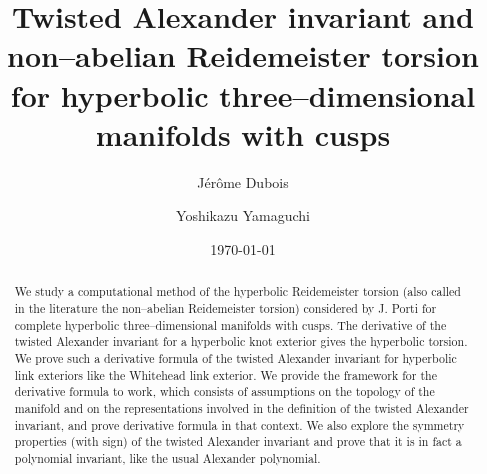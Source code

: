 \documentclass[a4paper]{amsart}
\theoremstyle{plain}
\theoremstyle{definition}
\theoremstyle{remark}
\begin{document}
%
%


\title{
Twisted Alexander invariant and non--abelian Reidemeister torsion for hyperbolic three--dimensional manifolds with cusps
}


\author{J\'er\^ome Dubois \and Yoshikazu Yamaguchi}

\address{Institut de Math\'ematiques de Jussieu, 
Universit\'e Paris Diderot--Paris 7, 
UFR de Math\'ematiques, 
Case 7012, B\^atiment Chevaleret,
75205 Paris Cedex 13
France}

\address{Department of Mathematics, 
Tokyo Institute of Technology, 
2-12-1 Ookayama Meguro-ku, Tokyo 152-8551, Japan
}

\date{\today}

\begin{abstract}
  We study a computational method of the hyperbolic Reidemeister torsion (also called in the literature the non--abelian Reidemeister torsion) considered by
  J. Porti for complete hyperbolic three--dimensional manifolds with cusps.  The
  derivative of the twisted Alexander invariant for a hyperbolic knot
  exterior gives the hyperbolic torsion.  We prove such a derivative
  formula of the twisted Alexander invariant for hyperbolic link
  exteriors like the Whitehead link exterior.  We provide the
  framework for the derivative formula to work, which consists of
  assumptions on the topology of the manifold and on the representations involved in the definition of the twisted Alexander invariant, and prove derivative formula in that context.  We also explore the symmetry properties (with sign) of
  the twisted Alexander invariant and prove that it is in fact a polynomial invariant, like the usual Alexander polynomial.
\end{abstract}
\end{document}
